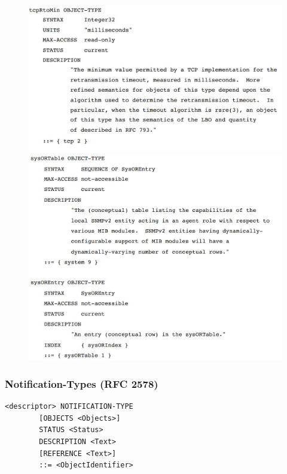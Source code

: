 \begin{figure}[H]
    \centering
    \includegraphics[width=\textwidth]{immagini/Object_Types.jpg}
    \includegraphics[width=\textwidth]{immagini/Object_Types2.jpg}
\end{figure}

\subsubsection{Notification-Types (RFC 2578)}

\begin{verbatim}
<descriptor> NOTIFICATION-TYPE
        [OBJECTS <Objects>]
        STATUS <Status>
        DESCRIPTION <Text>
        [REFERENCE <Text>]
        ::= <ObjectIdentifier>
\end{verbatim}

